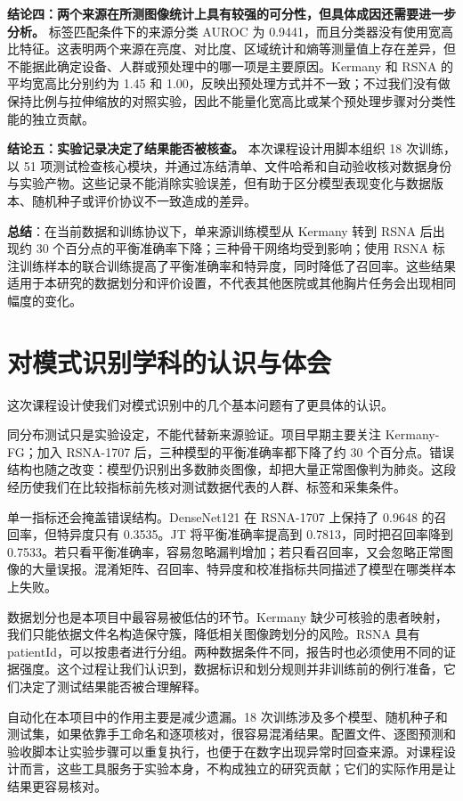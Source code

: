 \documentclass[12pt,a4paper,UTF8,openany]{ctexbook}
\begin{document}
\textbf{结论四：两个来源在所测图像统计上具有较强的可分性，但具体成因还需要进一步分析。} 标签匹配条件下的来源分类 AUROC 为 0.9441，而且分类器没有使用宽高比特征。这表明两个来源在亮度、对比度、区域统计和熵等测量值上存在差异，但不能据此确定设备、人群或预处理中的哪一项是主要原因。Kermany 和 RSNA 的平均宽高比分别约为 1.45 和 1.00，反映出预处理方式并不一致；不过我们没有做保持比例与拉伸缩放的对照实验，因此不能量化宽高比或某个预处理步骤对分类性能的独立贡献。

\textbf{结论五：实验记录决定了结果能否被核查。} 本次课程设计用脚本组织 18 次训练，以 51 项测试检查核心模块，并通过冻结清单、文件哈希和自动验收核对数据身份与实验产物。这些记录不能消除实验误差，但有助于区分模型表现变化与数据版本、随机种子或评价协议不一致造成的差异。\vspace{0.5cm}

\textbf{总结}：在当前数据和训练协议下，单来源训练模型从 Kermany 转到 RSNA 后出现约 30 个百分点的平衡准确率下降；三种骨干网络均受到影响；使用 RSNA 标注训练样本的联合训练提高了平衡准确率和特异度，同时降低了召回率。这些结果适用于本研究的数据划分和评价设置，不代表其他医院或其他胸片任务会出现相同幅度的变化。

\section{对模式识别学科的认识与体会}

这次课程设计使我们对模式识别中的几个基本问题有了更具体的认识。

同分布测试只是实验设定，不能代替新来源验证。项目早期主要关注 Kermany-FG；加入 RSNA-1707 后，三种模型的平衡准确率都下降了约 30 个百分点。错误结构也随之改变：模型仍识别出多数肺炎图像，却把大量正常图像判为肺炎。这段经历使我们在比较指标前先核对测试数据代表的人群、标签和采集条件。

单一指标还会掩盖错误结构。DenseNet121 在 RSNA-1707 上保持了 0.9648 的召回率，但特异度只有 0.3535。JT 将平衡准确率提高到 0.7813，同时把召回率降到 0.7533。若只看平衡准确率，容易忽略漏判增加；若只看召回率，又会忽略正常图像的大量误报。混淆矩阵、召回率、特异度和校准指标共同描述了模型在哪类样本上失败。

数据划分也是本项目中最容易被低估的环节。Kermany 缺少可核验的患者映射，我们只能依据文件名构造保守簇，降低相关图像跨划分的风险。RSNA 具有 patientId，可以按患者进行分组。两种数据条件不同，报告时也必须使用不同的证据强度。这个过程让我们认识到，数据标识和划分规则并非训练前的例行准备，它们决定了测试结果能否被合理解释。

自动化在本项目中的作用主要是减少遗漏。18 次训练涉及多个模型、随机种子和测试集，如果依靠手工命名和逐项核对，很容易混淆结果。配置文件、逐图预测和验收脚本让实验步骤可以重复执行，也便于在数字出现异常时回查来源。对课程设计而言，这些工具服务于实验本身，不构成独立的研究贡献；它们的实际作用是让结果更容易核对。
\end{document}
